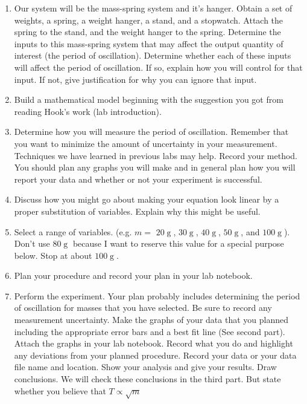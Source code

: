\documentclass[twoside,11pt,ShortChapTitles]{BYUTextbook}
\begin{document}
\begin{enumerate}
\item Our system will be the mass-spring system and it's hanger. Obtain a set
of weights, a spring, a weight hanger, a stand, and a stopwatch. Attach the
spring to the stand, and the weight hanger to the spring. Determine the inputs
to this mass-spring system that may affect the output quantity of interest
(the period of oscillation). Determine whether each of these inputs will
affect the period of oscillation. If so, explain how you will control for that
input. If not, give justification for why you can ignore that input.

\item Build a mathematical model beginning with the suggestion you got from
reading Hook's work (lab introduction).

\item Determine how you will measure the period of oscillation. Remember that
you want to minimize the amount of uncertainty in your measurement. Techniques
we have learned in previous labs may help. Record your method. You should plan
any graphs you will make and in general plan how you will report your data and
whether or not your experiment is successful.

\item Discuss how you might go about making your equation look linear by a
proper substitution of variables. Explain why this might be useful.

\item Select a range of variables. (e.g. $m=$ $20
\operatorname{g}
$, $30
\operatorname{g}
$, $40
\operatorname{g}
$, $50
\operatorname{g}
$, and $100
\operatorname{g}
$). Don't use $80
\operatorname{g}
$ because I want to reserve this value for a special purpose below. Stop at
about $100
\operatorname{g}
.$

\item Plan your procedure and record your plan in your lab notebook.

\item Perform the experiment. Your plan probably includes determining the
period of oscillation for masses that you have selected. Be sure to record any
measurement uncertainty. Make the graphs of your data that you planned
including the appropriate error bars and a best fit line (See second part). Attach the graphs in your lab notebook.
Record what you do and highlight any deviations from your planned procedure.
Record your data or your data file name and location. Show your analysis and
give your results. Draw conclusions. We will check these conclusions in the
third part. But state whether you believe that $T\propto\sqrt{m}$
\end{enumerate}
\end{document}
